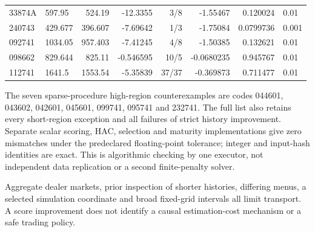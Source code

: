 \begin{longtable}{llrrrrrl}
33874A & 597.95 & 524.19 & -12.3355 & 3/8 & -1.55467 & 0.120024 & 0.01 \\

240743 & 429.677 & 396.607 & -7.69642 & 1/3 & -1.75084 & 0.0799736 & 0.001 \\

092741 & 1034.05 & 957.403 & -7.41245 & 4/8 & -1.50385 & 0.132621 & 0.01 \\

098662 & 829.644 & 825.11 & -0.546595 & 10/5 & -0.0680235 & 0.945767 & 0.01 \\

112741 & 1641.5 & 1553.54 & -5.35839 & 37/37 & -0.369873 & 0.711477 & 0.01 \\

\end{longtable}\endgroup

The seven sparse-procedure high-region counterexamples are codes 044601, 043602, 042601, 045601, 099741, 095741 and 232741. The full list also retains every short-region exception and all failures of strict history improvement. Separate scalar scoring, HAC, selection and maturity implementations give zero mismatches under the predeclared floating-point tolerance; integer and input-hash identities are exact. This is algorithmic checking by one executor, not independent data replication or a second finite-penalty solver.

Aggregate dealer markets, prior inspection of shorter histories, differing menus, a selected simulation coordinate and broad fixed-grid intervals all limit transport. A score improvement does not identify a causal estimation-cost mechanism or a safe trading policy.
